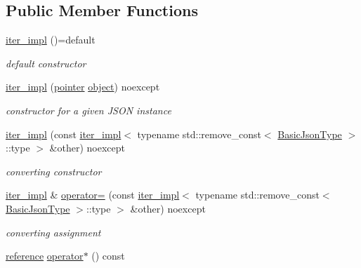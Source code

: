 \subsection*{Public Member Functions}
\begin{DoxyCompactItemize}
\item 
\hyperlink{classnlohmann_1_1detail_1_1iter__impl_a19aa457f9c4af1b7e3af59839132cc5c}{iter\+\_\+impl} ()=default
\begin{DoxyCompactList}\small\item\em default constructor \end{DoxyCompactList}\item 
\hyperlink{classnlohmann_1_1detail_1_1iter__impl_a88a00484ac201c52fc5f613d88a2918b}{iter\+\_\+impl} (\hyperlink{classnlohmann_1_1detail_1_1iter__impl_a69e52f890ce8c556fd68ce109e24b360}{pointer} \hyperlink{namespacenlohmann_1_1detail_a1ed8fc6239da25abcaf681d30ace4985aa8cfde6331bd59eb2ac96f8911c4b666}{object}) noexcept
\begin{DoxyCompactList}\small\item\em constructor for a given J\+S\+ON instance \end{DoxyCompactList}\item 
\hyperlink{classnlohmann_1_1detail_1_1iter__impl_a867f7eb55091be31b013adb3e46816d3}{iter\+\_\+impl} (const \hyperlink{classnlohmann_1_1detail_1_1iter__impl}{iter\+\_\+impl}$<$ typename std\+::remove\+\_\+const$<$ \hyperlink{classnlohmann_1_1detail_1_1iter__impl_abf18f18793f84b0222aebb5a2a87da7a}{Basic\+Json\+Type} $>$\+::type $>$ \&other) noexcept
\begin{DoxyCompactList}\small\item\em converting constructor \end{DoxyCompactList}\item 
\hyperlink{classnlohmann_1_1detail_1_1iter__impl}{iter\+\_\+impl} \& \hyperlink{classnlohmann_1_1detail_1_1iter__impl_a7159ed1cfe7c423a2baef8bea0c94509}{operator=} (const \hyperlink{classnlohmann_1_1detail_1_1iter__impl}{iter\+\_\+impl}$<$ typename std\+::remove\+\_\+const$<$ \hyperlink{classnlohmann_1_1detail_1_1iter__impl_abf18f18793f84b0222aebb5a2a87da7a}{Basic\+Json\+Type} $>$\+::type $>$ \&other) noexcept
\begin{DoxyCompactList}\small\item\em converting assignment \end{DoxyCompactList}\item 
\hyperlink{classnlohmann_1_1detail_1_1iter__impl_a5be8001be099c6b82310f4d387b953ce}{reference} \hyperlink{classnlohmann_1_1detail_1_1iter__impl_a5ca57856d9bba54a5fc51cee891de827}{operator$\ast$} () const

\end{DoxyCompactItemize}
